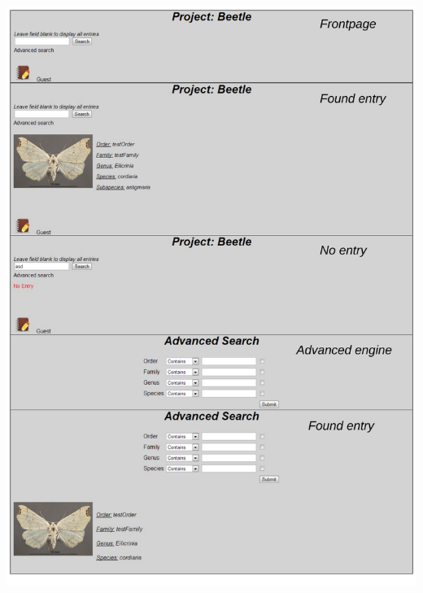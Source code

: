 \documentclass[12pt,a4paper]{article}
\begin{document}
\includegraphics[height=205mm]{UI1.pdf}
\newpage
\end{document}
